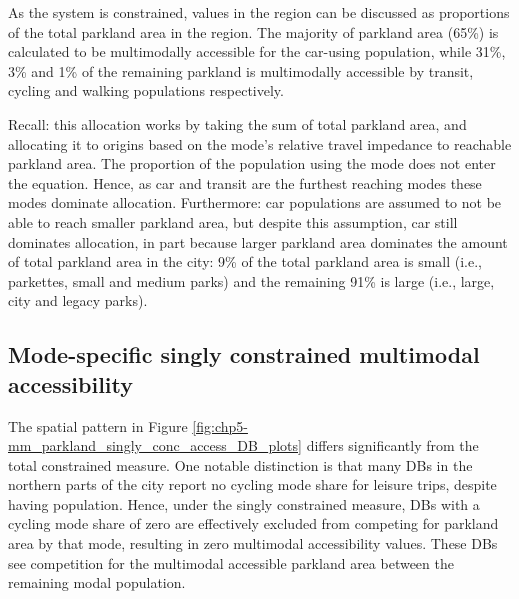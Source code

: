 \documentclass[
11pt, %
oneside, %
english, %
singlespacing, %
]{macthesis} %
\begin{document}
As the system is constrained, values in the region can be discussed as proportions of the total parkland area in the region. The majority of parkland area (65\%) is calculated to be multimodally accessible for the car-using population, while 31\%, 3\% and 1\% of the remaining parkland is multimodally accessible by transit, cycling and walking populations respectively.

Recall: this allocation works by taking the sum of total parkland area, and allocating it to origins based on the mode's relative travel impedance to reachable parkland area. The proportion of the population using the mode does not enter the equation. Hence, as car and transit are the furthest reaching modes these modes dominate allocation. Furthermore: car populations are assumed to not be able to reach smaller parkland area, but despite this assumption, car still dominates allocation, in part because larger parkland area dominates the amount of total parkland area in the city: 9\% of the total parkland area is small (i.e., parkettes, small and medium parks) and the remaining 91\% is large (i.e., large, city and legacy parks).

\subsection{Mode-specific singly constrained multimodal accessibility}\label{mode-specific-singly-constrained-multimodal-accessibility}

The spatial pattern in Figure \ref{fig:chp5-mm_parkland_singly_conc_access_DB_plots} differs significantly from the total constrained measure. One notable distinction is that many DBs in the northern parts of the city report no cycling mode share for leisure trips, despite having population. Hence, under the singly constrained measure, DBs with a cycling mode share of zero are effectively excluded from competing for parkland area by that mode, resulting in zero multimodal accessibility values. These DBs see competition for the multimodal accessible parkland area between the remaining modal population.
\end{document}
